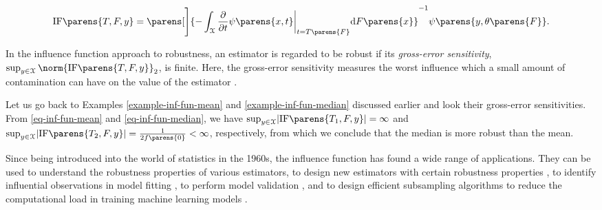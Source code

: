 \begin{example}[$M$-estimator]
	\begin{align*}%
		\mathrm{IF} \parens{T, F, y} = \parens[\Bigg]{- \int_{\calX} \frac{\partial}{\partial t} \psi \parens{x, t} \bigg\vert_{t = T \parens{F}} \diff F \parens{x}}^{-1} \psi \parens{y, \theta \parens{F}}. 
	\end{align*}
\end{example}


In the influence function approach to robustness, an estimator is regarded to be robust if its \textit{gross-error sensitivity}, $\sup_{y \in \calX} \norm{\mathrm{IF} \parens{T, F, y}}_2$, is finite. Here, the gross-error sensitivity measures the worst influence which a small amount of contamination can have on the value of the estimator \parencite{Hampel1986-ig}. %

Let us go back to Examples \ref{example-inf-fun-mean} and \ref{example-inf-fun-median} discussed earlier and look their gross-error sensitivities. From \eqref{eq-inf-fun-mean} and \eqref{eq-inf-fun-median}, we have $\sup_{y \in \calX} \abs{\mathrm{IF} \parens{T_1, F, y}} = \infty$ and $\sup_{y \in \calX} \abs{\mathrm{IF} \parens{T_2, F, y}} = \frac{1}{2 f \parens{0}} < \infty$, respectively, from which we conclude that the median is more robust than the mean. 

Since being introduced into the world of statistics in the 1960s, the influence function has found a wide range of applications. They can be used to understand the robustness properties of various estimators, to design new estimators with certain robustness properties \parencite{Hampel1986-ig}, to identify influential observations in model fitting \parencite{Cook1977-xo, Cook1982-gj}, to perform model validation \parencite{Debruyne2008-qt, Koh2017-yb}, and to design efficient subsampling algorithms to reduce the computational load in training machine learning models \parencite{Ting2018-fa, Raj2020-la}. 


